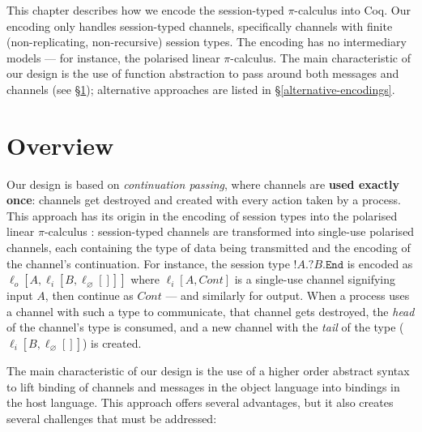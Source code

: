 \documentclass{mproj}
\newcommand{\picalc}{$\pi$-calculus}
\newcommand{\type}{\texttt}
\newcommand{\End}{\type{End}}
\newcommand{\Send}[1]{!#1.}
\newcommand{\Recv}[1]{?#1.}
\renewcommand{\emptyset}{\varnothing}
\begin{document}
This chapter describes how we encode the session-typed \picalc{} into Coq. Our encoding only handles session-typed channels, specifically channels with finite (non-replicating, non-recursive) session types. The encoding has no intermediary models --- for instance, the polarised linear \picalc{}. The main characteristic of our design is the use of function abstraction to pass around both messages and channels (see \S \ref{overview}); alternative approaches are listed in \S \ref{alternative-encodings}. 

\section{Overview}\label{overview}

Our design is based on \emph{continuation passing}, where channels are \textbf{used exactly once}: channels get destroyed and created with every action taken by a process. This approach has its origin in the encoding of session types into the polarised linear \picalc{} \cite{Kobayashi1999, Dardha2012, Dardha2016}: session-typed channels are transformed into single-use polarised channels, each containing the type of data being transmitted and the encoding of the channel's continuation. For instance, the session type $\Send{A} \Recv{B} \End$ is encoded as $\ell_o [A,\ell_i [B,\ell_\emptyset []]]$ where $\ell_i [A, Cont]$ is a single-use channel signifying input $A$, then continue as $Cont$ --- and similarly for output. When a process uses a channel with such a type to communicate, that channel gets destroyed, the \emph{head} of the channel's type is consumed, and a new channel with the \emph{tail} of the type ($\ell_i [B, \ell_\emptyset []]$) is created.

The main characteristic of our design is the use of a higher order abstract syntax to lift binding of channels and messages in the object language into bindings in the host language. This approach offers several advantages, but it also creates several challenges that must be addressed:

\end{document}

